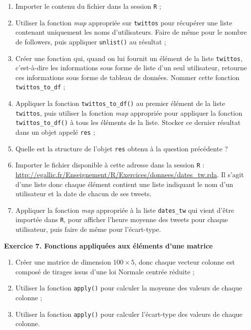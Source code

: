 \documentclass[
  11pt,
]{book}
\makeatletter
\providecommand{\tightlist}{%
  \setlength{\itemsep}{0pt}\setlength{\parskip}{0pt}}
\numberwithin{equation}{section}
\numberwithin{countremarque}{section}
\newenvironment{exframe}{%
 \def\at@end@of@exframe{}%
 \ifinner\ifhmode%
  \def\at@end@of@exframe{\end{minipage}}%
  \begin{minipage}{\columnwidth}%
 \fi\fi%
 \def\FrameCommand##1{\hskip\@totalleftmargin \hskip-\fboxsep
 \colorbox{shadecolorex}{##1}\hskip-\fboxsep
     \hskip-\linewidth \hskip-\@totalleftmargin \hskip\columnwidth}%
 \MakeFramed {\advance\hsize-\width
   \@totalleftmargin\z@ \linewidth\hsize
   \@setminipage}}%
 {\par\unskip\endMakeFramed%
 \at@end@of@exframe}
\makeatother
\begin{document}
\begin{exframe}
\begin{enumerate}
\def\labelenumi{\arabic{enumi}.}
\tightlist
\item
  Importer le contenu du fichier dans la session \texttt{R} ;
\item
  Utiliser la fonction \emph{map} appropriée sur \texttt{twittos} pour récupérer une liste contenant uniquement les noms d'utilisateurs. Faire de même pour le nombre de followers, puis appliquer \texttt{unlist()} au résultat ;
\item
  Créer une fonction qui, quand on lui fournit un élément de la liste \texttt{twittos}, c'est-à-dire les informations sous forme de liste d'un seul utilisateur, retourne ces informations sous forme de tableau de données. Nommer cette fonction \texttt{twittos\_to\_df} ;
\item
  Appliquer la fonction \texttt{twittos\_to\_df()} au premier élément de la liste \texttt{twittos}, puis utiliser la fonction \emph{map} appropriée pour appliquer la fonction \texttt{twittos\_to\_df()} à tous les éléments de la liste. Stocker ce dernier résultat dans un objet appelé \texttt{res} ;
\item
  Quelle est la structure de l'objet \texttt{res} obtenu à la question précédente ?
\item
  Importer le fichier disponible à cette adresse dans la session \texttt{R} : \url{http://egallic.fr/Enseignement/R/Exercices/donnees/dates_tw.rda}. Il s'agit d'une liste donc chaque élément contient une liste indiquant le nom d'un utilisateur et la date de chacun de ses tweets.
\item
  Appliquer la fonction \emph{map} appropriée à la liste \texttt{dates\_tw} qui vient d'être importée dans \texttt{R}, pour afficher l'heure moyenne des tweets pour chaque utilisateur, puis faire de même pour l'écart-type.
\end{enumerate}
\end{exframe}

\begin{exframe}
\textbf{Exercice 7. Fonctions appliquées aux éléments d'une matrice}

\begin{enumerate}
\def\labelenumi{\arabic{enumi}.}
\tightlist
\item
  Créer une matrice de dimension \(100\times 5\), donc chaque vecteur colonne est composé de tirages issus d'une loi Normale centrée réduite ;
\item
  Utiliser la fonction \texttt{apply()} pour calculer la moyenne des valeurs de chaque colonne ;
\item
  Utiliser la fonction \texttt{apply()} pour calculer l'écart-type des valeurs de chaque colonne.
\end{enumerate}
\end{exframe}
\end{document}
